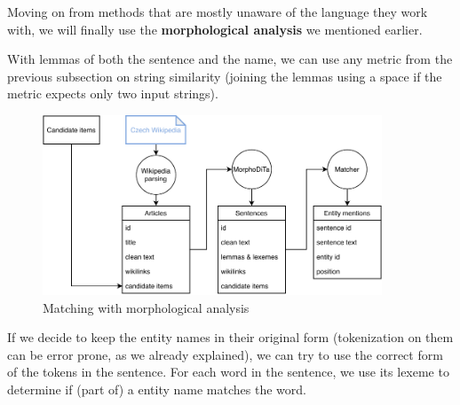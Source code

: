 




Moving on from methods that are mostly unaware of the language they work with, we will finally use the \textbf{morphological analysis} we mentioned earlier.

With lemmas of both the sentence and the name, we can use any metric from the previous subsection on string similarity (joining the lemmas using a space if the metric expects only two input strings).



\begin{figure}[h]\centering
\includegraphics[width=0.9\textwidth]{./img/Diplomka diagramy-Detailed_text}
\caption{Matching with morphological analysis}
\label{obr:DiagramTextDetail}
\end{figure}

If we decide to keep the entity names in their original form (tokenization on them can be error prone, as we already explained), we can try to use the correct form of the tokens in the sentence. For each word in the sentence, we use its lexeme to determine if (part of) a entity name matches the word.

